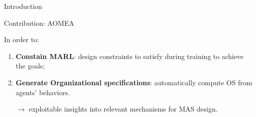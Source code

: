 \begin{frame}[allowframebreaks]{Introduction}
\begin{prosblock}{Contribution: AOMEA}
        \

        In order to:
        \begin{enumerate}
            \item \textbf{Constain MARL}: design constraints to satisfy during training to achieve the goals;
            \item \textbf{Generate Organizational specifications}: automatically compute OS from agents' behaviors.

                  $\rightarrow$ exploitable insights into relevant mechanisms for MAS design.
        \end{enumerate}

    \end{prosblock}


\end{frame}